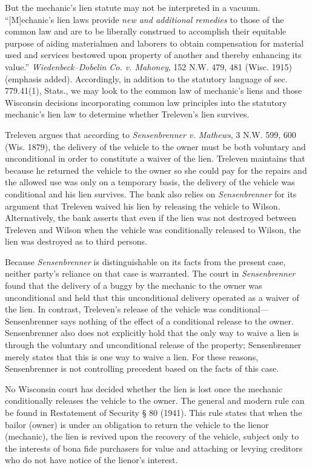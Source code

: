 But the mechanic's lien statute may not be interpreted in a vacuum.
``[M]echanic's lien laws provide \textit{new and additional remedies} to those
of the common law and are to be liberally construed to accomplish their
equitable purpose of aiding materialmen and laborers to obtain compensation for
material used and services bestowed upon property of another and thereby
enhancing its value.'' \textit{Wiedenbeck--Dobelin Co. v. Mahoney}, 152 N.W.
479, 481 (Wisc. 1915) (emphasis added). Accordingly, in addition to the
statutory language of sec. 779.41(1), Stats., we may look to the common law of
mechanic's liens and those Wisconsin decisions incorporating common law
principles into the statutory mechanic's lien law to determine whether
Treleven's lien survives.

Treleven argues that according to \textit{Sensenbrenner v. Mathews}, 3 N.W. 599,
600 (Wis. 1879), the delivery of the vehicle to the owner must be both
voluntary and unconditional in order to constitute a waiver of the lien.
Treleven maintains that because he returned the vehicle to the owner so she
could pay for the repairs and the allowed use was only on a temporary basis,
the delivery of the vehicle was conditional and his lien survives. The bank
also relies on \textit{Sensenbrenner} for its argument that Treleven waived his
lien by releasing the vehicle to Wilson. Alternatively, the bank asserts that
even if the lien was not destroyed between Treleven and Wilson when the vehicle
was conditionally released to Wilson, the lien was destroyed as to third
persons.

Because \textit{Sensenbrenner} is distinguishable on its facts from the present
case, neither party's reliance on that case is warranted. The court in
\textit{Sensenbrenner} found that the delivery of a buggy by the mechanic to
the owner was unconditional and held that this unconditional delivery operated
as a waiver of the lien. In contrast, Treleven's release of the vehicle was
conditional---Sensenbrenner says nothing of  the effect of a conditional
release to the owner. Sensenbrenner also does not explicitly hold that the only
way to waive a lien is through the voluntary and unconditional release of the
property; Sensenbrenner merely states that this is one way to waive a lien. For
these reasons, Sensenbrenner is not controlling precedent based on the facts of
this case.

No Wisconsin court has decided whether the lien is lost once the mechanic
conditionally releases the vehicle to the owner. The general and modern rule
can be found in Restatement of Security {\S} 80 (1941). This rule states that
when the bailor (owner) is under an obligation to return the vehicle to the
lienor (mechanic), the lien is revived upon the recovery of the vehicle,
subject only to the interests of bona fide purchasers for value and attaching
or levying creditors who do not have notice of the lienor's interest.

